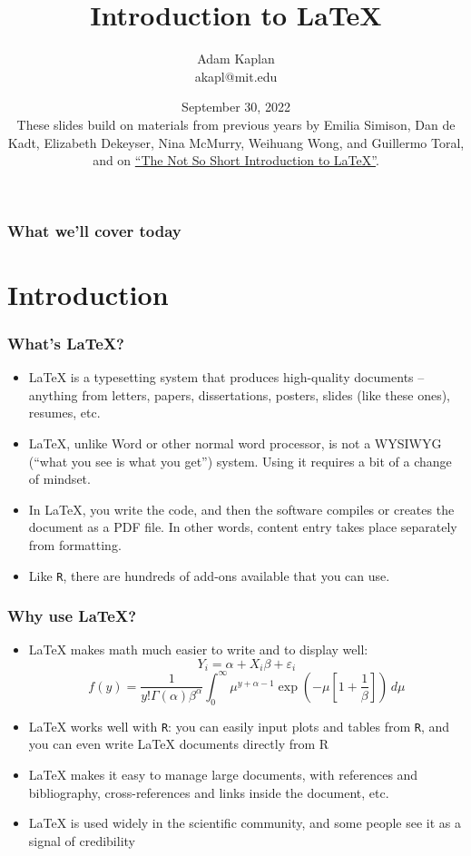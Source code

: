 \documentclass[xcolor=dvipsnames]{beamer} %
\title{Introduction to \LaTeX}
\author[Kaplan]{Adam Kaplan\\akapl@mit.edu}
\date[Sept 30, 2020]{September 30, 2022\\ \vspace{1em} {\footnotesize These slides build on materials from
    previous years by Emilia Simison, Dan de Kadt, Elizabeth Dekeyser, Nina McMurry, Weihuang Wong, and Guillermo Toral, and on \href{https://tobi.oetiker.ch/lshort/lshort.pdf}{``The Not So Short Introduction to \LaTeX{}''}.}}
\begin{document}

\frame{\titlepage}


\begin{frame}
  \frametitle{What we'll cover today}
  \tableofcontents
\end{frame}

\section{Introduction}

\begin{frame}
  \frametitle{What's \LaTeX?}
  \begin{itemize}
    \item \LaTeX{} is a typesetting system that produces high-quality documents --
          anything from letters, papers, dissertations, posters, slides (like
          these ones), resumes, etc. \pause
    \item \LaTeX, unlike Word or other normal word processor, is not a WYSIWYG (``what you see is what
          you get'') system. Using it requires a bit of a change of mindset. \pause
    \item In \LaTeX, you write the code, and then the software compiles or creates
          the document as a PDF file.  In other words, content entry takes place separately from formatting.
          \pause
    \item Like \texttt{R}, there are hundreds of add-ons available that you can use.
  \end{itemize}
\end{frame}


\begin{frame}
  \frametitle{Why use \LaTeX?}
  \begin{itemize}
    \item \LaTeX{} makes math much easier to write and to display well: \pause
          $$ Y_{i} = \alpha + X_i\beta + \varepsilon_i $$ \pause
          $$ f(y) = \frac{1}{y!\Gamma(\alpha)\beta^\alpha}\int_{0}^{\infty} \mu^{y+\alpha-1} \exp\left(-\mu\left[1+\frac{1}{\beta}\right]\right)\,d\mu $$ \pause
    \item \LaTeX{} works well with \texttt{R}: you can easily input plots and tables
          from \texttt{R}, and you can even write \LaTeX{} documents directly from R \pause
    \item \LaTeX{} makes it easy to manage large documents, with references
          and bibliography, cross-references and links inside the document, etc. \pause
    \item \LaTeX{} is used widely in the scientific community, and some people see it as a signal of credibility
  \end{itemize}
\end{frame}
\end{document}
